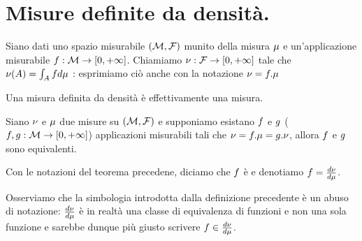 \section{Misure definite da densit\`a.}
\label{Misura_MisureDefiniteDaDensita}
\begin{Definition}
	Siano dati uno spazio misurabile $(\mathcal{M},\mathcal{F})$ munito
  della misura $\mu$ e un'applicazione misurabile
  $f: \mathcal{M} \rightarrow [0,+\infty]$. Chiamiamo
  $\nu: \mathcal{F} \rightarrow [0, +\infty]$ tale che
  $\nu(A) = \int_A f d\mu$
  :
  esprimiamo ci\`o anche con la notazione
  $\nu = f.\mu$
\end{Definition}
\begin{Theorem}
	Una misura definita da densit\`a \`e effettivamente una misura.
\end{Theorem}
\begin{Theorem}
	Siano $\nu$ e $\mu$ due misure su
  $(\mathcal{M},\mathcal{F})$ e supponiamo esistano
  $f$ e $g$
  ($f, g:
  \mathcal{M} \rightarrow [0,+\infty]$) applicazioni misurabili tali che
  $\nu
    = f.\mu
    = g.\nu$, allora
  $f$ e $g$ sono equivalenti.
\end{Theorem}
\begin{Definition}
	Con le notazioni del teorema precedene, diciamo che $f$ \`e
   e
  denotiamo $f = \frac{d\nu}{d\mu}$.
\end{Definition}
\par Osserviamo che la simbologia introdotta dalla definizione precedente \`e un
abuso di notazione:
$\frac{d\nu}{d\mu}$ \`e in realt\`a una classe di
equivalenza di funzioni e non una sola funzione e sarebbe dunque pi\`u giusto
scrivere
$f \in \frac{d\nu}{d\mu}$.
